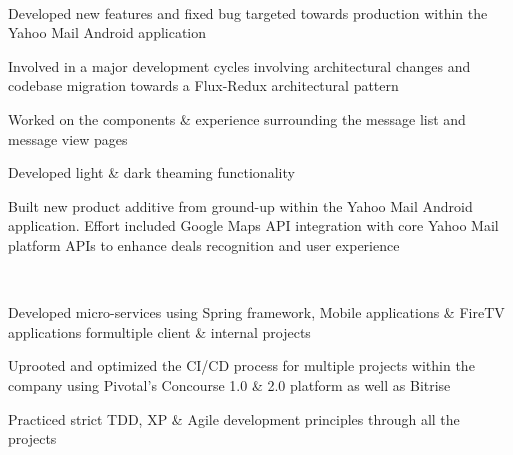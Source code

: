 \documentclass[a4paper]{resume}
\begin{document}
\begin{minipage}[t]{0.66\textwidth} 


 \\
\vspace{\topsep} %
\begin{tightemize}
\item Developed new features and fixed bug targeted towards production within the Yahoo Mail Android application 
\item Involved in a major development cycles involving architectural changes and codebase migration towards a Flux-Redux architectural pattern
\item Worked on the components \& experience surrounding the message list and message view pages
\item Developed light \& dark theaming functionality
\item Built new product additive from ground-up within the Yahoo Mail Android application. Effort included Google Maps API integration with core Yahoo Mail platform APIs to enhance deals recognition and user experience
\end{tightemize}
\sectionsep

 \\
\vspace{\topsep} %
\begin{tightemize}
\item Developed micro-services using Spring framework, Mobile applications \& FireTV applications formultiple client \& internal projects
\item Uprooted and optimized the CI/CD process for multiple projects within the company using Pivotal’s Concourse 1.0 \& 2.0 platform as well as Bitrise
\item Practiced strict TDD, XP \& Agile development principles through all the projects
\end{tightemize}
\sectionsep


\end{minipage}
\end{document}
